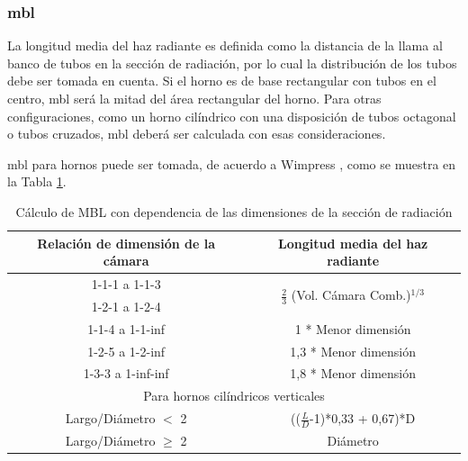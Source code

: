 \subsubsection{\ac{mbl}}
\par La longitud media del haz radiante es definida como la distancia de la llama al banco de tubos en la sección de radiación, por lo cual la distribución de los tubos debe ser tomada en cuenta. Si el horno es de base rectangular con tubos en el centro, \ac{mbl} será la mitad del área rectangular del horno. Para otras configuraciones, como un horno cilíndrico con una disposición de tubos octagonal o tubos cruzados, \ac{mbl} deberá ser calculada con esas consideraciones.
\par \ac{mbl} para hornos puede ser tomada, de acuerdo a Wimpress \cite{bib:wimpress}, como se muestra en la Tabla \ref{tbl:mbl}.
\begin{table}[H]
\caption[Cálculo de MBL]{Cálculo de MBL con dependencia de las dimensiones de la sección de radiación}
\label{tbl:mbl}
\centering
\begin{tabular}{c|c}
    Relación de dimensión de la cámara  & Longitud media del haz radiante \\
    \hline
    1-1-1 a 1-1-3   & \multirow{2}{12em}{$\frac{2}{3}$ (Vol. Cámara Comb.)$^{1/3}$} \\
    1-2-1 a 1-2-4   & \\
    \hline
    1-1-4 a 1-1-inf & 1 * Menor dimensión \\
    \hline
    1-2-5 a 1-2-inf   & 1,3 * Menor dimensión \\
    \hline
    1-3-3 a 1-inf-inf & 1,8 * Menor dimensión \\
    \hline
    \multicolumn{2}{c}{Para hornos cilíndricos verticales} \\
    \hline
    Largo/Diámetro $<$ 2  & (($\frac{L}{D}$-1)*0,33 + 0,67)*D\\
    \hline
    Largo/Diámetro $\geq$ 2 & Diámetro\\
\end{tabular}
\end{table}

